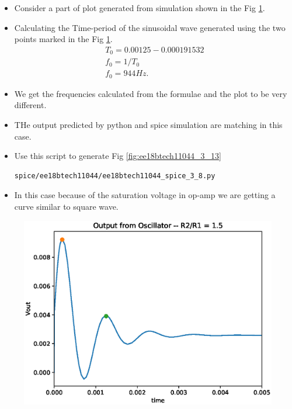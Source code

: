 \begin{enumerate}[label=\arabic*.,ref=\theenumi]
 \solution
 \begin{itemize}
     \item Consider a part of plot generated from simulation shown in the Fig \ref{fig:ee18btech11044_3_17}.
     \item Calculating the Time-period of the sinusoidal wave generated using the two points marked in the Fig \ref{fig:ee18btech11044_3_17}.
     \begin{align}
         T_0 = 0.00125 - 0.000191532 \\
         f_0 = 1/T_0 \\
         f_0 = 944Hz.
     \end{align}
     \item We get the frequencies calculated from the formulae and the plot to be very different.
     \item THe output predicted by python and spice simulation are matching in this case.
     \item Use this script to generate Fig \ref{fig:ee18btech11044_3_13}
\begin{lstlisting}
spice/ee18btech11044/ee18btech11044_spice_3_8.py
\end{lstlisting}
\item In this case because of the saturation voltage in op-amp we are getting a curve similar to square wave.
 \end{itemize}
 

 
\begin{figure}[!ht]
\centering
\includegraphics[width=\columnwidth]{./figs/ee18btech11044/ee18btech11044_3_17.eps}
\caption{}
\label{fig:ee18btech11044_3_17}
\end{figure}



\end{enumerate}
